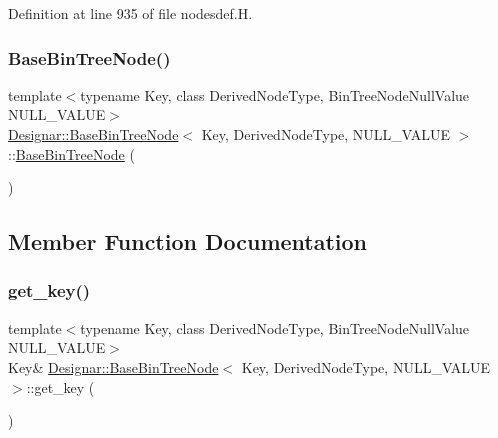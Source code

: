 Definition at line 935 of file nodesdef.\+H.

\mbox{\label{class_designar_1_1_base_bin_tree_node_a455b27b565e1dc004fd6292475d5a9de}} 
\subsubsection{\texorpdfstring{Base\+Bin\+Tree\+Node()}{BaseBinTreeNode()}\hspace{0.1cm}{\footnotesize\ttfamily [5/5]}}
{\footnotesize\ttfamily template$<$typename Key, class Derived\+Node\+Type, Bin\+Tree\+Node\+Null\+Value N\+U\+L\+L\+\_\+\+V\+A\+L\+UE$>$ \\
\hyperlink{class_designar_1_1_base_bin_tree_node}{Designar\+::\+Base\+Bin\+Tree\+Node}$<$ Key, Derived\+Node\+Type, N\+U\+L\+L\+\_\+\+V\+A\+L\+UE $>$\+::\hyperlink{class_designar_1_1_base_bin_tree_node}{Base\+Bin\+Tree\+Node} (\begin{DoxyParamCaption}\item[{const \hyperlink{class_designar_1_1_base_bin_tree_node}{Base\+Bin\+Tree\+Node}$<$ Key, Derived\+Node\+Type, N\+U\+L\+L\+\_\+\+V\+A\+L\+UE $>$ \&}]{ }\end{DoxyParamCaption})\hspace{0.3cm}{\ttfamily [delete]}}



\subsection{Member Function Documentation}
\mbox{\label{class_designar_1_1_base_bin_tree_node_a59c9489fff0bd46c058e901d02b2e582}} 
\subsubsection{\texorpdfstring{get\+\_\+key()}{get\_key()}\hspace{0.1cm}{\footnotesize\ttfamily [1/2]}}
{\footnotesize\ttfamily template$<$typename Key, class Derived\+Node\+Type, Bin\+Tree\+Node\+Null\+Value N\+U\+L\+L\+\_\+\+V\+A\+L\+UE$>$ \\
Key\& \hyperlink{class_designar_1_1_base_bin_tree_node}{Designar\+::\+Base\+Bin\+Tree\+Node}$<$ Key, Derived\+Node\+Type, N\+U\+L\+L\+\_\+\+V\+A\+L\+UE $>$\+::get\+\_\+key (\begin{DoxyParamCaption}{ }\end{DoxyParamCaption})\hspace{0.3cm}{\ttfamily [inline]}}



